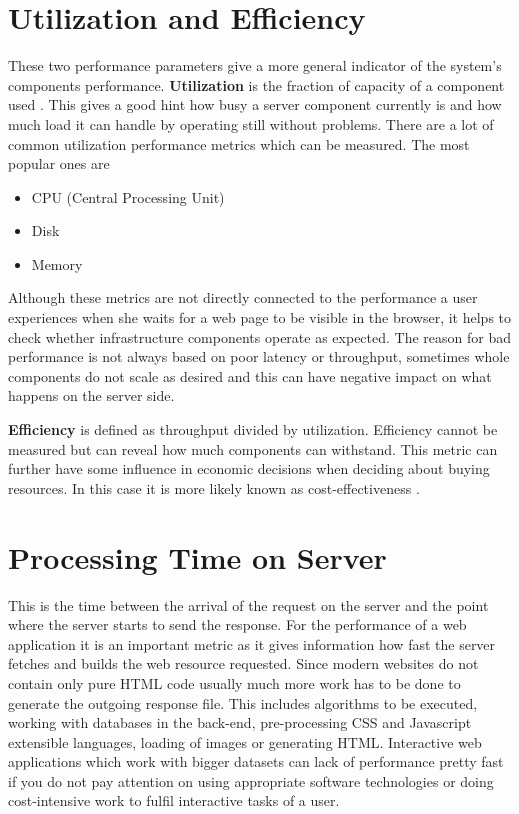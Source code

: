 \section{Utilization and Efficiency}
These two performance parameters give a more general indicator of the system's components performance. \textbf{Utilization} is the fraction of capacity of a component used \cite{Killelea_2002}. This gives a good hint how busy a server component currently is and how much load it can handle by operating still without problems. There are a lot of common utilization performance metrics which can be measured. The most popular ones are
\begin{itemize}
	\item{CPU (Central Processing Unit)}
	\item{Disk}
	\item{Memory}
\end{itemize} 

Although these metrics are not directly connected to the performance a user experiences when she waits for a web page to be visible in the browser, it helps to check whether infrastructure components operate as expected. The reason for bad performance is not always based on poor latency or throughput, sometimes whole components do not scale as desired and this can have negative impact on what happens on the server side.

\textbf{Efficiency} is defined as throughput divided by utilization. Efficiency cannot be measured but can reveal how much components can withstand. This metric can further have some influence in economic decisions when deciding about buying resources. In this case it is more likely known as cost-effectiveness \cite{Killelea_2002}.
   
\section{Processing Time on Server}
This is the time between the arrival of the request on the server and the point where the server starts to send the response. For the performance of a web application it is an important metric as it gives information how fast the server fetches and builds the web resource requested. Since modern websites do not contain only pure HTML code usually much more work has to be done to generate the outgoing response file. This includes algorithms to be executed, working with databases in the back-end, pre-processing CSS and Javascript extensible languages, loading of images or generating HTML. Interactive web applications which work with bigger datasets can lack of performance pretty fast if you do not pay attention on using appropriate software technologies or doing cost-intensive work to fulfil interactive tasks of a user. 

